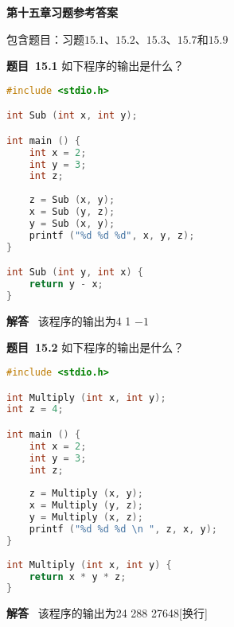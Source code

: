 \documentclass[10pt,a4paper,UTF8]{ctexart}
\newcommand{\problemname}{待定义}
\newenvironment{problem}{\begin{shaded}\par\noindent\textbf{题目\  \problemname}}{\end{shaded}\par}
\newenvironment{solution}{\par\noindent\textbf{解答}\ }{\par}
\begin{document}
\begin{center}
\LARGE\textbf{第十五章习题参考答案}
\end{center}

{\kaishu 包含题目：习题$15.1$、$15.2$、$15.3$、$15.7$和$15.9$}



	



\renewcommand{\problemname}{15.1}
\begin{problem}
	如下程序的输出是什么？
	\begin{lstlisting}[language=C]
#include <stdio.h> 

int Sub (int x, int y); 

int main () { 
	int x = 2; 
	int y = 3; 
	int z; 
  
	z = Sub (x, y); 
	x = Sub (y, z); 
	y = Sub (x, y); 
	printf ("%d %d %d", x, y, z); 
} 

int Sub (int y, int x) { 
	return y - x; 
}
	\end{lstlisting}
\end{problem}

\begin{solution}
	该程序的输出为4 1 $-1$
\end{solution}


\renewcommand{\problemname}{15.2}
\begin{problem}
	如下程序的输出是什么？
	\begin{lstlisting}[language=C]
#include <stdio.h>

int Multiply (int x, int y); 
int z = 4; 

int main () { 
	int x = 2; 
	int y = 3; 
	int z; 
	 
	z = Multiply (x, y); 
	x = Multiply (y, z); 
	y = Multiply (x, z); 
	printf ("%d %d %d \n ", z, x, y); 
}  
   
int Multiply (int x, int y)	{ 
	return x * y * z; 
} 		   
	\end{lstlisting}
\end{problem}

\begin{solution}
	该程序的输出为24 288 27648[换行]
\end{solution}
\end{document}
